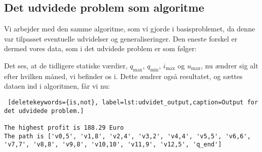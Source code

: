 \subsection{Det udvidede problem som algoritme}
Vi arbejder med den samme algoritme, som vi gjorde i basisproblemet, da denne var tilpasset eventuelle udvidelser og generaliseringer. Den eneste forskel er dermed vores data, som i det udvidede problem er som følger:

 

Det ses, at de tidligere statiske værdier, $q_{\max}$, $q_{\min}$, $i_{\max}$ og $u_{\max}$, nu ændrer sig alt efter hvilken måned, vi befinder os i. Dette ændrer også resultatet, og sættes dataen ind i algoritmen, får vi nu:


\begin{lstlisting} [deletekeywords={is,not}, label=lst:udvidet_output,caption=Output for det udvidede problem.]

The highest profit is 188.29 Euro
The path is ['v0,5', 'v1,8', 'v2,4', 'v3,2', 'v4,4', 'v5,5', 'v6,6', 'v7,7', 'v8,8', 'v9,8', 'v10,10', 'v11,9', 'v12,5', 'q_end']

\end{lstlisting}
